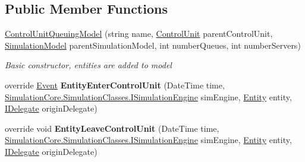 \subsection*{Public Member Functions}
\begin{DoxyCompactItemize}
\item 
\hyperlink{class_simple_queue_example_1_1_model_elements_1_1_control_unit_queuing_model_a95991635b212543a3eb6c5ee646d3c7a}{Control\+Unit\+Queuing\+Model} (string name, \hyperlink{class_simulation_core_1_1_h_c_c_m_elements_1_1_control_unit}{Control\+Unit} parent\+Control\+Unit, \hyperlink{class_simulation_core_1_1_simulation_classes_1_1_simulation_model}{Simulation\+Model} parent\+Simulation\+Model, int number\+Queues, int number\+Servers)
\begin{DoxyCompactList}\small\item\em Basic constructor, entities are added to model \end{DoxyCompactList}\item 
override \hyperlink{class_simulation_core_1_1_h_c_c_m_elements_1_1_event}{Event} {\bfseries Entity\+Enter\+Control\+Unit} (Date\+Time time, \hyperlink{interface_simulation_core_1_1_simulation_classes_1_1_i_simulation_engine}{Simulation\+Core.\+Simulation\+Classes.\+I\+Simulation\+Engine} sim\+Engine, \hyperlink{class_simulation_core_1_1_h_c_c_m_elements_1_1_entity}{Entity} entity, \hyperlink{interface_simulation_core_1_1_h_c_c_m_elements_1_1_i_delegate}{I\+Delegate} origin\+Delegate)\hypertarget{class_simple_queue_example_1_1_model_elements_1_1_control_unit_queuing_model_adfd5278e6b57f75f61743fb0cfc4568a}{}\label{class_simple_queue_example_1_1_model_elements_1_1_control_unit_queuing_model_adfd5278e6b57f75f61743fb0cfc4568a}

\item 
override void {\bfseries Entity\+Leave\+Control\+Unit} (Date\+Time time, \hyperlink{interface_simulation_core_1_1_simulation_classes_1_1_i_simulation_engine}{Simulation\+Core.\+Simulation\+Classes.\+I\+Simulation\+Engine} sim\+Engine, \hyperlink{class_simulation_core_1_1_h_c_c_m_elements_1_1_entity}{Entity} entity, \hyperlink{interface_simulation_core_1_1_h_c_c_m_elements_1_1_i_delegate}{I\+Delegate} origin\+Delegate)\hypertarget{class_simple_queue_example_1_1_model_elements_1_1_control_unit_queuing_model_a9697dc2bef5c80f552073ed963c8e443}{}\label{class_simple_queue_example_1_1_model_elements_1_1_control_unit_queuing_model_a9697dc2bef5c80f552073ed963c8e443}

\end{DoxyCompactItemize}
